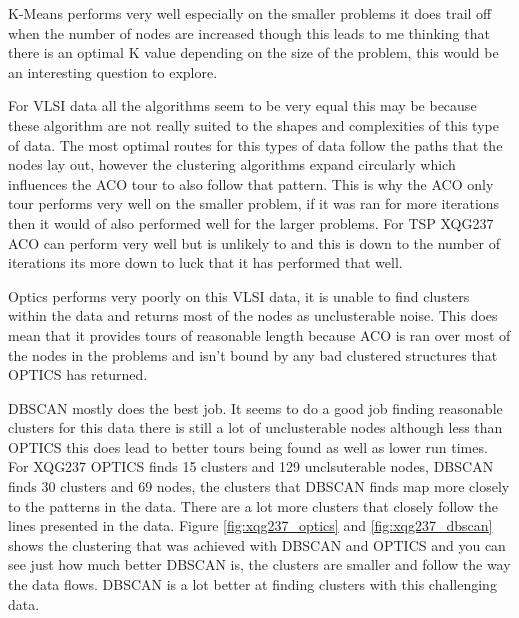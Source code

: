 K-Means performs very well especially on the smaller problems it does trail off when the number of nodes are increased though this leads to me thinking that there is an optimal K value depending on the size of the problem, this would be an interesting question to explore. 

For VLSI data all the algorithms seem to be very equal this may be because these algorithm are not really suited to the shapes and complexities of this type of data. The most optimal routes for this types of data follow the paths that the nodes lay out, however the clustering algorithms expand circularly which influences the ACO tour to also follow that pattern. This is why the ACO only tour performs very well on the smaller problem, if it was ran for more iterations then it would of also performed well for the larger problems. For TSP XQG237 ACO can perform very well but is unlikely to and this is down to the number of iterations its more down to luck that it has performed that well.

Optics performs very poorly on this VLSI data, it is unable to find clusters within the data and returns most of the nodes as unclusterable noise. This does mean that it provides tours of reasonable length because ACO is ran over most of the nodes in the problems and isn't bound by any bad clustered structures that OPTICS has returned.

DBSCAN mostly does the best job. It seems to do a good job finding reasonable clusters for this data there is still a lot of unclusterable nodes although less than OPTICS this does lead to better tours being found as well as lower run times. For XQG237 OPTICS finds 15 clusters and 129 unclsuterable nodes, DBSCAN finds 30 clusters and 69 nodes, the clusters that DBSCAN finds map more closely to the patterns in the data. There are a lot more clusters that closely follow the lines presented in the data. Figure \ref{fig:xqg237_optics} and \ref{fig:xqg237_dbscan} shows the clustering that was achieved with DBSCAN and OPTICS and you can see just how much better DBSCAN is, the clusters are smaller and follow the way the data flows. DBSCAN is a lot better at finding clusters with this challenging data.

